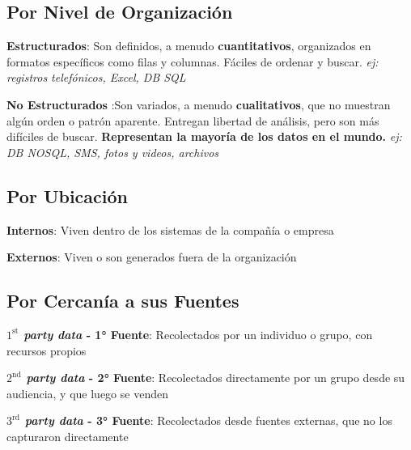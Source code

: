 \subsection{Por Nivel de Organización}
\begin{description}
    \item {\textbf{Estructurados}: Son definidos, a menudo \textbf{cuantitativos}, organizados en formatos específicos como filas y columnas. Fáciles de ordenar y buscar. \textit{ej: registros telefónicos, Excel, DB SQL}}
    \item {\textbf{No Estructurados} :Son variados, a menudo \textbf{cualitativos}, que no muestran algún orden o patrón aparente. Entregan libertad de análisis, pero son más difíciles de buscar. \textbf{Representan la mayoría de los datos en el mundo.} \textit{ej: DB NOSQL, SMS, fotos y videos, archivos}}
\end{description}

\subsection{Por Ubicación}
\begin{description}
    \item {\textbf{Internos}: Viven dentro de los sistemas de la compañía o empresa}
    \item {\textbf{Externos}: Viven o son generados fuera de la organización}
\end{description}

\subsection{Por Cercanía a sus Fuentes}
\begin{description}
    \item {\textbf{\textit{$1^{\text{st}}$ party data} - 1° Fuente}: Recolectados por un individuo o grupo, con recursos propios}
    \item {\textbf{\textit{$2^{\text{nd}}$ party data} - 2° Fuente}: Recolectados directamente por un grupo desde su audiencia, y que luego se venden}
    \item {\textbf{\textit{$3^{\text{rd}}$ party data} - 3° Fuente}: Recolectados desde fuentes externas, que no los capturaron directamente}
\end{description}

